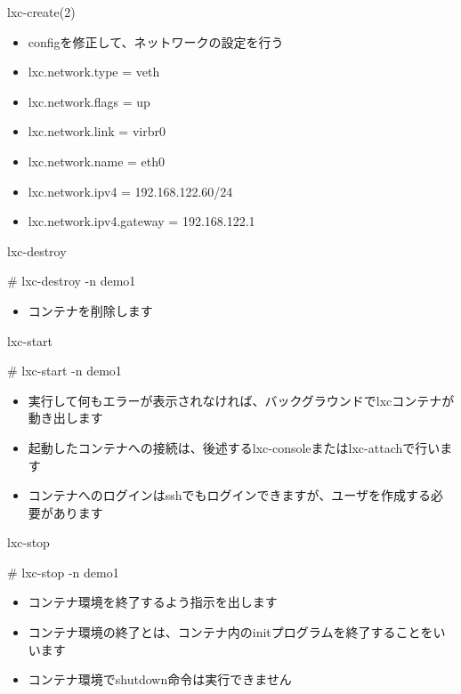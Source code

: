\begin{frame}[containsverbatim]{lxc-create(2)}
  \begin{itemize}
  \item configを修正して、ネットワークの設定を行う
  \item lxc.network.type = veth
  \item lxc.network.flags = up
  \item lxc.network.link = virbr0
  \item lxc.network.name = eth0
  \item lxc.network.ipv4 = 192.168.122.60/24
  \item lxc.network.ipv4.gateway = 192.168.122.1
  \end{itemize}
\end{frame}

\begin{frame}[containsverbatim]{lxc-destroy}
  \begin{commandline}
  # lxc-destroy -n demo1
  \end{commandline}
  \begin{itemize}
  \item コンテナを削除します
  \end{itemize}
\end{frame}

\begin{frame}[containsverbatim]{lxc-start}
  \begin{commandline}
  # lxc-start -n demo1
  \end{commandline}
  \begin{itemize}
  \item 実行して何もエラーが表示されなければ、バックグラウンドでlxcコンテナが動き出します
  \item 起動したコンテナへの接続は、後述するlxc-consoleまたはlxc-attachで行います
  \item コンテナへのログインはsshでもログインできますが、ユーザを作成する必要があります
  \end{itemize}
\end{frame}

\begin{frame}[containsverbatim]{lxc-stop}
  \begin{commandline}
  # lxc-stop -n demo1
  \end{commandline}
  \begin{itemize}
  \item コンテナ環境を終了するよう指示を出します
  \item コンテナ環境の終了とは、コンテナ内のinitプログラムを終了することをいいます
  \item コンテナ環境でshutdown命令は実行できません
  \end{itemize}
\end{frame}

